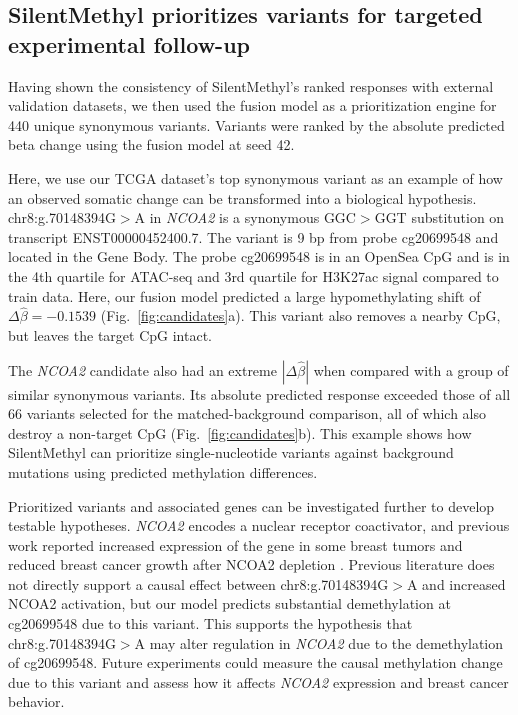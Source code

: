 \documentclass[11pt,letterpaper]{article}
\begin{document}
\subsection{SilentMethyl prioritizes variants for targeted experimental follow-up}
Having shown the consistency of SilentMethyl's ranked responses with external validation datasets, we then used the fusion model as a prioritization engine for 440 unique synonymous variants. Variants were ranked by the absolute predicted beta change using the fusion model at seed 42. 

Here, we use our TCGA dataset's top synonymous variant as an example of how an observed somatic change can be transformed into a biological hypothesis. chr8:g.70148394G$>$A in \textit{NCOA2} is a synonymous GGC$>$GGT substitution on transcript ENST00000452400.7. The variant is 9 bp from probe cg20699548 and located in the Gene Body. The probe cg20699548 is in an OpenSea CpG and is in the 4th quartile for ATAC-seq and 3rd quartile for H3K27ac signal compared to train data. Here, our fusion model predicted a large hypomethylating shift of $\Delta\widehat\beta=-0.1539$ (Fig.~\ref{fig:candidates}a). This variant also removes a nearby CpG, but leaves the target CpG intact.

The \textit{NCOA2} candidate also had an extreme $|\Delta\widehat\beta|$ when compared with a group of similar synonymous variants. Its absolute predicted response exceeded those of all 66 variants selected for the matched-background comparison, all of which also destroy a non-target CpG (Fig.~\ref{fig:candidates}b). This example shows how SilentMethyl can prioritize single-nucleotide variants against background mutations using predicted methylation differences.

Prioritized variants and associated genes can be investigated further to develop testable hypotheses. \textit{NCOA2} encodes a nuclear receptor coactivator, and previous work reported increased expression of the gene in some breast tumors and reduced breast cancer growth after NCOA2 depletion \cite{cai2019ncoa2}. Previous literature does not directly support a causal effect between chr8:g.70148394G$>$A and increased NCOA2 activation, but our model predicts substantial demethylation at cg20699548 due to this variant. This supports the hypothesis that chr8:g.70148394G$>$A may alter regulation in \textit{NCOA2} due to the demethylation of cg20699548. Future experiments could measure the causal methylation change due to this variant and assess how it affects \textit{NCOA2} expression and breast cancer behavior.
\end{document}
